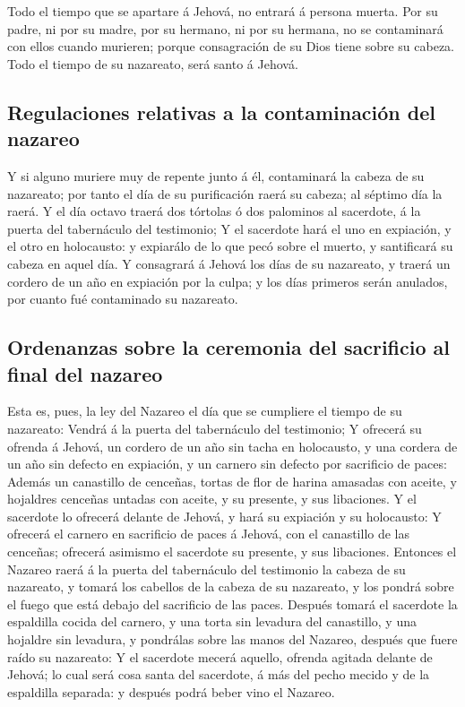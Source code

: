  Todo el tiempo que se apartare á Jehová, no entrará á
persona muerta.  Por su padre, ni por su madre, por su
hermano, ni por su hermana, no se contaminará con ellos cuando murieren;
porque consagración de su Dios tiene sobre su cabeza.  Todo
el tiempo de su nazareato, será santo á Jehová.

\hypertarget{regulaciones-relativas-a-la-contaminaciuxf3n-del-nazareo}{%
\subsection{Regulaciones relativas a la contaminación del
nazareo}\label{regulaciones-relativas-a-la-contaminaciuxf3n-del-nazareo}}

 Y si alguno muriere muy de repente junto á él, contaminará
la cabeza de su nazareato; por tanto el día de su purificación raerá su
cabeza; al séptimo día la raerá.  Y el día octavo traerá
dos tórtolas ó dos palominos al sacerdote, á la puerta del tabernáculo
del testimonio;  Y el sacerdote hará el uno en expiación, y
el otro en holocausto: y expiarálo de lo que pecó sobre el muerto, y
santificará su cabeza en aquel día.  Y consagrará á Jehová
los días de su nazareato, y traerá un cordero de un año en expiación por
la culpa; y los días primeros serán anulados, por cuanto fué contaminado
su nazareato.

\hypertarget{ordenanzas-sobre-la-ceremonia-del-sacrificio-al-final-del-nazareo}{%
\subsection{Ordenanzas sobre la ceremonia del sacrificio al final del
nazareo}\label{ordenanzas-sobre-la-ceremonia-del-sacrificio-al-final-del-nazareo}}

 Esta es, pues, la ley del Nazareo el día que se cumpliere
el tiempo de su nazareato: Vendrá á la puerta del tabernáculo del
testimonio;  Y ofrecerá su ofrenda á Jehová, un cordero de
un año sin tacha en holocausto, y una cordera de un año sin defecto en
expiación, y un carnero sin defecto por sacrificio de paces:
 Además un canastillo de cenceñas, tortas de flor de harina
amasadas con aceite, y hojaldres cenceñas untadas con aceite, y su
presente, y sus libaciones.  Y el sacerdote lo ofrecerá
delante de Jehová, y hará su expiación y su holocausto:  Y
ofrecerá el carnero en sacrificio de paces á Jehová, con el canastillo
de las cenceñas; ofrecerá asimismo el sacerdote su presente, y sus
libaciones.  Entonces el Nazareo raerá á la puerta del
tabernáculo del testimonio la cabeza de su nazareato, y tomará los
cabellos de la cabeza de su nazareato, y los pondrá sobre el fuego que
está debajo del sacrificio de las paces.  Después tomará el
sacerdote la espaldilla cocida del carnero, y una torta sin levadura del
canastillo, y una hojaldre sin levadura, y pondrálas sobre las manos del
Nazareo, después que fuere raído su nazareato:  Y el
sacerdote mecerá aquello, ofrenda agitada delante de Jehová; lo cual
será cosa santa del sacerdote, á más del pecho mecido y de la espaldilla
separada: y después podrá beber vino el Nazareo.

